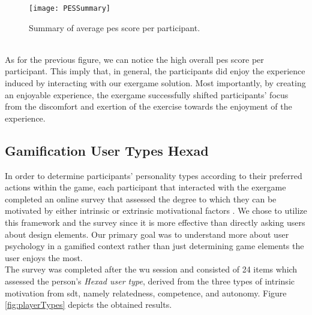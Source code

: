 \begin{figure}[h]
    \centering
    \texttt{[image: PESSummary]}
    \caption{Summary of average \acrshort{pes} score per participant.}
    \label{fig:pes}
\end{figure}\\
As for the previous figure, we can notice the high overall \acrshort{pes} score per participant. This imply that, in general, the participants did enjoy the experience induced by interacting with our exergame solution. Most importantly, by creating an enjoyable experience,  the exergame successfully shifted participants' focus from the discomfort and exertion of the exercise towards the enjoyment of the experience. 
\subsection{Gamification User Types Hexad}
In order to determine participants' personality types according to their preferred actions within the game, each participant that interacted with the exergame completed an online survey that assessed the degree to which they can be motivated by either intrinsic or extrinsic motivational factors \cite{tondello2016gamification}. We chose to utilize this framework and the survey since it is more effective than directly asking users about design elements. Our primary goal was to understand more about user psychology in a gamified context rather than just determining game elements the user enjoys the most. \\The survey was completed after the \acrshort{wu} session and consisted of 24 items which assessed the person's \textit{Hexad user type}, derived from the three types of intrinsic motivation from \acrshort{sdt}, namely relatedness, competence, and autonomy. Figure \ref{fig:playerTypes} depicts the obtained results. 
